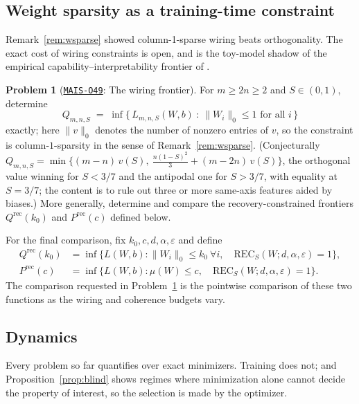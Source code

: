 \documentclass[11pt]{amsart}
\newcommand{\Oid}[1]{\href{https://github.com/lionellevine/MAIS/blob/main/open-problems/MAIS-O#1.md}{\texttt{MAIS-O#1}}}
\theoremstyle{plain}
\theoremstyle{definition}
\newtheorem{problem}[theorem]{Problem}
\begin{document}
\subsection{Weight sparsity as a training-time constraint}

Remark~\ref{rem:wsparse} showed column-1-sparse wiring beats orthogonality. The exact cost of wiring constraints is open, and is the toy-model shadow of the empirical capability--interpretability frontier of \cite{gao2025}.

\begin{problem}[\Oid{49}: The wiring frontier]\label{prob:wsparse}
For $m\ge 2n\ge2$ and $S\in(0,1)$, determine
\[
Q_{m,n,S} \;=\; \inf\bigl\{\,L_{m,n,S}(W,b)\ :\ \|W_i\|_0\le 1 \text{ for all } i\,\bigr\}
\]
exactly; here $\|v\|_0$ denotes the number of nonzero entries of $v$, so the constraint is column-$1$-sparsity in the sense of Remark~\ref{rem:wsparse}. (Conjecturally $Q_{m,n,S}=\min\bigl\{(m-n)\,v(S),\ \tfrac{n(1-S)^2}{3}+(m-2n)\,v(S)\bigr\}$, the orthogonal value winning for $S<3/7$ and the antipodal one for $S>3/7$, with equality at $S=3/7$; the content is to rule out three or more same-axis features aided by biases.) More generally, determine and compare the recovery-constrained frontiers $Q^{\mathrm{rec}}(k_0)$ and $P^{\mathrm{rec}}(c)$ defined below.
\end{problem}

For the final comparison, fix $k_0,c,d,\alpha,\varepsilon$ and define
\[
\begin{aligned}
Q^{\mathrm{rec}}(k_0)&=\inf\{L(W,b):\|W_i\|_0\le k_0\ \forall i,\quad
\mathrm{REC}_S(W;d,\alpha,\varepsilon)=1\},\\
P^{\mathrm{rec}}(c)&=\inf\{L(W,b):\mu(W)\le c,\quad
\mathrm{REC}_S(W;d,\alpha,\varepsilon)=1\}.
\end{aligned}
\]
The comparison requested in Problem~\ref{prob:wsparse} is the pointwise comparison of these two functions as the wiring and coherence budgets vary.

\subsection{Dynamics}

Every problem so far quantifies over exact minimizers. Training does not; and Proposition~\ref{prop:blind} shows regimes where minimization alone cannot decide the property of interest, so the selection is made by the optimizer.
\end{document}
